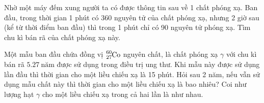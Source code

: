 \begin{vd}
	Nhờ một máy đếm xung người ta có được thông tin sau về 1 chất phóng xạ. Ban đầu, trong thời gian 1 phút có 360 nguyên tử của chất phóng xạ, nhưng 2 giờ sau (kể từ thời điểm ban đầu) thì trong 1 phút chỉ có 90 nguyên tử phóng xạ. Tìm chu kì bán rã của chất phóng xạ này.
\end{vd}
\begin{vd}
Một mẫu ban đầu chứa đồng vị $\ce{^{60}_{27}Co}$ nguyên chất, là chất phóng xạ $\gamma$ với chu kì bán rã $\SI{5.27}{\text{năm}}$ được sử dụng trong điều trị ung thư. Khi mẫu này được sử dụng lần đầu thì thời gian cho một liều chiếu xạ là 15 phút. Hỏi sau 2 năm, nếu vẫn sử dụng mẫu chất này thì thời gian cho một liều chiếu xạ là bao nhiêu? Coi như lượng hạt $\gamma$ cho một liều chiếu xạ trong cả hai lần là như nhau.
\end{vd}
